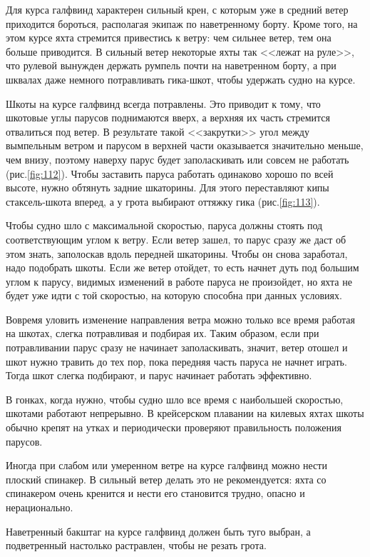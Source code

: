 \documentclass[a4paper, 12pt, twoside, final]{scrbook}
\begin{document}
Для курса галфвинд характерен сильный крен, с которым уже в средний ветер приходится бороться, располагая экипаж по наветренному борту. Кроме того, на этом курсе яхта стремится привестись к ветру: чем сильнее ветер, тем она больше приводится. В сильный ветер некоторые яхты так <<лежат на руле>>, что рулевой вынужден держать румпель почти на наветренном борту, а при шквалах даже немного потравливать гика-шкот, чтобы удержать судно на курсе.

Шкоты на курсе галфвинд всегда потравлены. Это приводит к тому, что шкотовые углы парусов поднимаются вверх, а верхняя их часть стремится отвалиться под ветер. В результате такой <<закрутки>> угол между вымпельным ветром и парусом в верхней части оказывается значительно меньше, чем внизу, поэтому наверху парус будет заполаскивать или совсем не работать (рис.\ref{fig:112}). Чтобы заставить паруса работать одинаково хорошо по всей высоте, нужно обтянуть задние шкаторины. Для этого переставляют кипы стаксель-шкота вперед, а у грота выбирают оттяжку гика (рис.\ref{fig:113}).

Чтобы судно шло с максимальной скоростью, паруса должны стоять под соответствующим углом к ветру. Если ветер зашел, то парус сразу же даст об этом знать, заполоскав вдоль передней шкаторины. Чтобы он снова заработал, надо подобрать шкоты. Если же ветер отойдет, то есть начнет дуть под большим углом к парусу, видимых изменений в работе паруса не произойдет, но яхта не будет уже идти с той скоростью, на которую способна при данных условиях.

Вовремя уловить изменение направления ветра можно только все время работая на шкотах, слегка потравливая и подбирая их. Таким образом, если при потравливании парус сразу не начинает заполаскивать, значит, ветер отошел и шкот нужно травить до тех пор, пока передняя часть паруса не начнет играть. Тогда шкот слегка подбирают, и парус начинает работать эффективно.

В гонках, когда нужно, чтобы судно шло все время с наибольшей скоростью, шкотами работают непрерывно. В крейсерском плавании на килевых яхтах шкоты обычно крепят на утках и периодически проверяют правильность положения парусов.

Иногда при слабом или умеренном ветре на курсе галфвинд можно нести плоский спинакер. В сильный ветер делать это не рекомендуется: яхта со спинакером очень кренится и нести его становится трудно, опасно и нерационально.

Наветренный бакштаг на курсе галфвинд должен быть туго выбран, а подветренный настолько растравлен, чтобы не резать грота.
\end{document}
